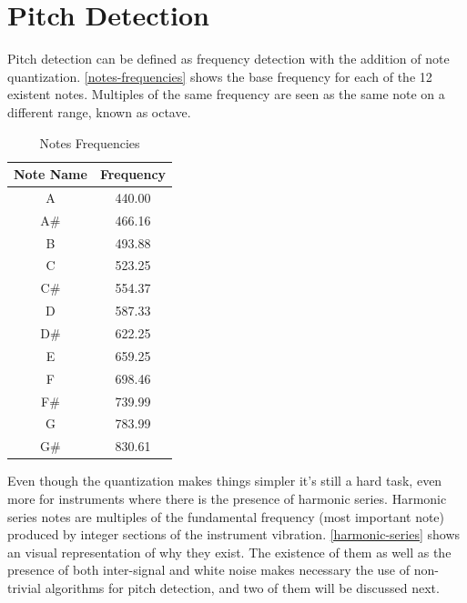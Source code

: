 \section{Pitch Detection}
\label{pitch-detection}

Pitch detection can be defined as frequency detection with the addition of note quantization.
\autoref{notes-frequencies} shows the base frequency for each of the 12 existent
notes. Multiples of the same frequency are seen as the same note on a different
range, known as octave.
\begin{table}[htb]
  \begin{center}
    \ABNTEXreducedfont
    \caption[Notes Frequencies]{Notes Frequencies}
    \label{notes-frequencies}
    \begin{tabular}{c|c}
      \hline
      Note Name & Frequency\\
      \hline \hline
      A & 440.00 \\
      A\# & 466.16 \\
      B & 493.88 \\
      C & 523.25 \\
      C\# & 554.37 \\
      D & 587.33 \\
      D\# & 622.25 \\
      E & 659.25 \\
      F & 698.46 \\
      F\# & 739.99 \\
      G & 783.99 \\
      G\# & 830.61 \\
      \hline
    \end{tabular}
  \end{center}
\end{table}
Even though the quantization makes things simpler it's still a hard task, even
more for instruments where there is the presence of harmonic series. Harmonic
series notes are multiples of the fundamental frequency (most important
note) produced by integer sections of the instrument vibration. \autoref{harmonic-series}
shows an visual representation of why they exist. The existence of them as well
as the presence of both inter-signal and white noise makes necessary the use of
non-trivial algorithms for pitch detection, and two of them will be discussed next.
